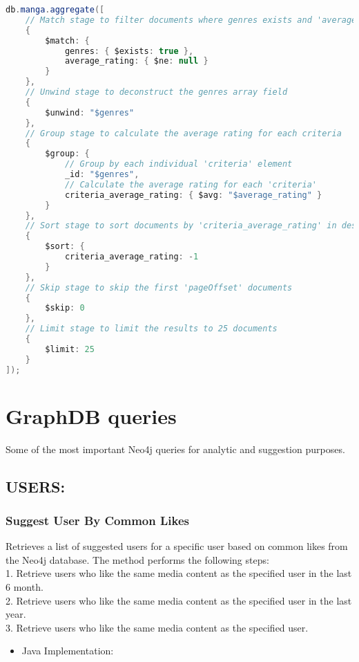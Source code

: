 \begin{mdframed}[style=customstyle2]
\begin{lstlisting}[language=java, backgroundcolor=\color{white}]
db.manga.aggregate([
    // Match stage to filter documents where genres exists and 'average_rating' is not null
    {
        $match: {
            genres: { $exists: true },
            average_rating: { $ne: null }
        }
    },
    // Unwind stage to deconstruct the genres array field
    {
        $unwind: "$genres"
    },
    // Group stage to calculate the average rating for each criteria
    {
        $group: {
            // Group by each individual 'criteria' element
            _id: "$genres",
            // Calculate the average rating for each 'criteria'
            criteria_average_rating: { $avg: "$average_rating" }
        }
    },
    // Sort stage to sort documents by 'criteria_average_rating' in descending order
    {
        $sort: {
            criteria_average_rating: -1
        }
    },
    // Skip stage to skip the first 'pageOffset' documents
    {
        $skip: 0
    },
    // Limit stage to limit the results to 25 documents
    {
        $limit: 25
    }
]);\end{lstlisting}
\end{mdframed}
  
\vspace{\baselineskip}

\section{GraphDB queries}
Some of the most important Neo4j queries for analytic and suggestion purposes.
\subsection*{USERS:}
\subsubsection*{Suggest User By Common Likes}

Retrieves a list of suggested users for a specific user based on common likes from the Neo4j database.
The method performs the following steps:\\
1. Retrieve users who like the same media content as the specified user in the last 6 month.\\
2. Retrieve users who like the same media content as the specified user in the last year.\\
3. Retrieve users who like the same media content as the specified user.\\
\newpage
\begin{itemize}
    \item Java Implementation:
\end{itemize}

